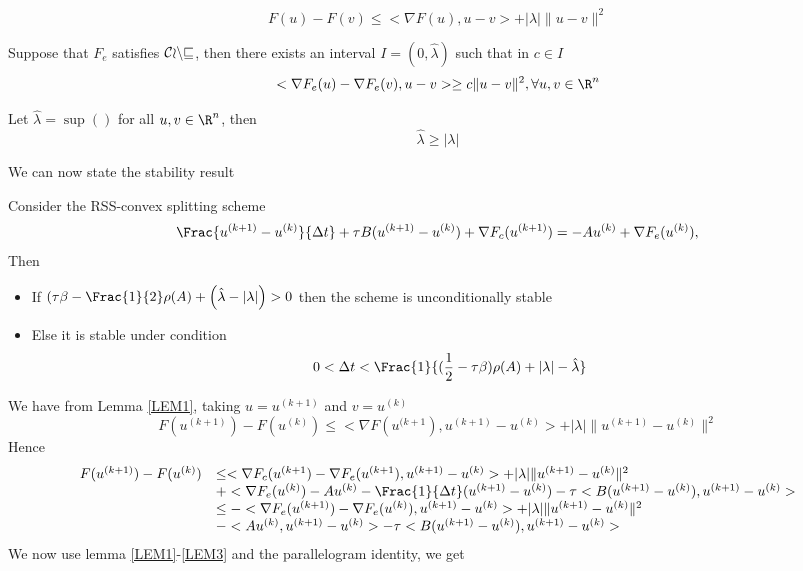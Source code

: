 {\begin{lemma}
$$
F(u)-F(v)\le <\nabla F(u),u-v>+|\lambda |\|u-v\|^2
$$
\end{lemma}
\begin{lemma}\label{LEM2}
Suppose that $F_e$ satisfies ${\cal Conv}$, then there exists an interval $I=(0,{\hat \lambda})$ such that in $c\in I$
$$
<\nabla F_e(u)-\nabla F_e(v),u-v> \ge c \|u-v\|^2, \forall u,v \in \R^n
$$
\end{lemma}
\begin{lemma}\label{LEM3}
Let ${\hat \lambda}=\sup()$ for all $u,v \in \R^n$, then
$$
{\hat \lambda} \ge |\lambda|
$$
\end{lemma}
We can now state the stability result
\begin{theorem_amiens}
Consider the RSS-convex splitting scheme
\begin{eqnarray}\label{NLGRSSSPLIT}
\Frac{u^{(k+1)}-u^{(k)}}{\Delta t} +\tau B(u^{(k+1)}-u^{(k)})+\nabla F_c(u^{(k+1)})=-Au^{(k)}+\nabla F_e(u^{(k)}),
\end{eqnarray}
Then
\begin{itemize}
\item If $(\tau \beta -\Frac{1}{2}\rho(A) +\left( {\hat \lambda}- |\lambda| \right) >0$ then the scheme is unconditionally stable 
\item Else it is stable under condition
$$
0<\Delta t<\Frac{1}{(\frac{1}{2}-\tau \beta)\rho(A) +|\lambda| -{\hat \lambda}}
$$
\end{itemize}
\end{theorem_amiens}
\begin{proof_amiens}
We have from Lemma \ref{LEM1}, taking $u=u^{(k+1)}$ and $v=u^{(k)}$
$$
F(u^{(k+1)})-F(u^{(k)})\le <\nabla F(u^{(k+1}),u^{(k+1)}-u^{(k)}>+
|\lambda | \|u^{(k+1)}-u^{(k)}\|^2
$$
Hence
$$
\begin{array}{ll}
F(u^{(k+1)})-F(u^{(k)})&\le <\nabla F_c(u^{(k+1})-\nabla F_e(u^{(k+1}),u^{(k+1)}-u^{(k)}>
+|\lambda| \|u^{(k+1)}-u^{(k)}\|^2\\
&+<\nabla F_e(u^{(k)})-Au^{(k)}-\Frac{1}{\Delta t}(u^{(k+1)}-u^{(k)})
-\tau <B(u^{(k+1)}-u^{(k)}),u^{(k+1)}-u^{(k)}>\\
 & \le -<\nabla F_e(u^{(k+1)})-\nabla F_e(u^{(k)}),u^{(k+1)}-u^{(k)}>+|\lambda | 
 \|u^{(k+1)}-u^{(k)}\|^2\\
  & -<Au^{(k)},u^{(k+1)}-u^{(k)}>- \tau <B(u^{(k+1)}-u^{(k)}),u^{(k+1)}-u^{(k)}>
\end{array}
$$
We now use lemma \ref{LEM1}-\ref{LEM3} and the parallelogram identity, we get
$$
\begin{array}{ll}

\end{array}$$
\end{proof_amiens}}
